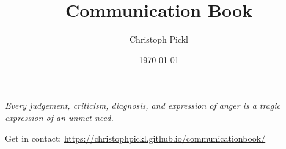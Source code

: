 \documentclass[11pt]{book}
\title{Communication Book}
\date{\today}
\author{Christoph Pickl}
\begin{document}

    \maketitle

    \tableofcontents
    \vfill
    \begin{center}
        \textit{Every judgement, criticism, diagnosis, and expression of anger is a tragic expression of an unmet need.}
    \end{center}
    \vfill
    \noindent
    \small{Get in contact: \url{https://christophpickl.github.io/communicationbook/}}
    \newpage


    
    
    
    
    
    
    
    

    \printglossaries
\end{document}
